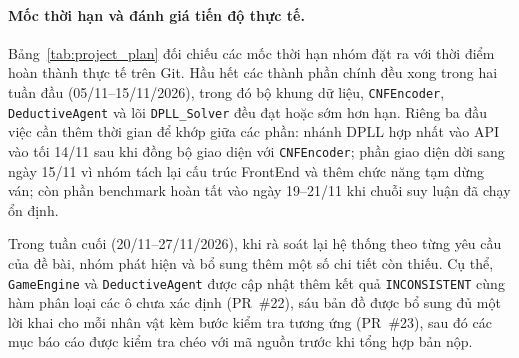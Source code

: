 \begin{sloppypar}
\paragraph{Mốc thời hạn và đánh giá tiến độ thực tế.}
Bảng~\ref{tab:project_plan} đối chiếu các mốc thời hạn nhóm đặt ra với thời điểm hoàn thành thực tế trên Git. Hầu hết các thành phần chính đều xong trong hai tuần đầu (05/11--15/11/2026), trong đó bộ khung dữ liệu, \texttt{CNFEncoder}, \texttt{DeductiveAgent} và lõi \texttt{DPLL\_Solver} đều đạt hoặc sớm hơn hạn. Riêng ba đầu việc cần thêm thời gian để khớp giữa các phần: nhánh DPLL hợp nhất vào API vào tối 14/11 sau khi đồng bộ giao diện với \texttt{CNFEncoder}; phần giao diện dời sang ngày 15/11 vì nhóm tách lại cấu trúc FrontEnd và thêm chức năng tạm dừng ván; còn phần benchmark hoàn tất vào ngày 19--21/11 khi chuỗi suy luận đã chạy ổn định.

Trong tuần cuối (20/11--27/11/2026), khi rà soát lại hệ thống theo từng yêu cầu của đề bài, nhóm phát hiện và bổ sung thêm một số chi tiết còn thiếu. Cụ thể, \texttt{GameEngine} và \texttt{DeductiveAgent} được cập nhật thêm kết quả \texttt{INCONSISTENT} cùng hàm phân loại các ô chưa xác định (PR~\#22), sáu bản đồ được bổ sung đủ một lời khai cho mỗi nhân vật kèm bước kiểm tra tương ứng (PR~\#23), sau đó các mục báo cáo được kiểm tra chéo với mã nguồn trước khi tổng hợp bản nộp.


\end{sloppypar}
